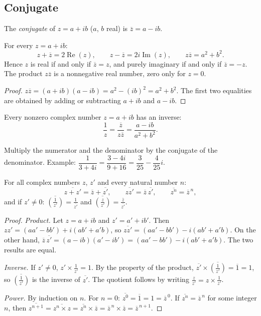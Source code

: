 \subsection{Conjugate}
\begin{definition}[Conjugate]
The \emph{conjugate} of $z=a+ib$ ($a$, $b$ real) is $\overline{z}=a-ib$.
\end{definition}
\begin{theorem}
For every $z=a+ib$:
\[z+\overline z=2\operatorname{Re}(z),\qquad z-\overline z=2i\operatorname{Im}(z),\qquad z\overline z=a^2+b^2.\]
Hence $z$ is real if and only if $\overline z=z$, and purely imaginary if and only if $\overline z=-z$. The product $z\overline z$ is a nonnegative real number, zero only for $z=0$.
\end{theorem}
\begin{proof}
$z\overline z=(a+ib)(a-ib)=a^2-(ib)^2=a^2+b^2$. The first two equalities are obtained by adding or subtracting $a+ib$ and $a-ib$.
\end{proof}
\begin{theorem}
Every nonzero complex number $z=a+ib$ has an inverse:
\[\frac1z=\frac{\overline z}{z\overline z}=\frac{a-ib}{a^2+b^2}.\]
\end{theorem}
\begin{method}
Multiply the numerator and the denominator by the conjugate of the denominator. Example: $\dfrac{1}{3+4i}=\dfrac{3-4i}{9+16}=\dfrac{3}{25}-\dfrac{4}{25}i$.
\end{method}
\begin{theorem}
For all complex numbers $z$, $z'$ and every natural number $n$:
\[\overline{z+z'}=\overline z+\overline{z'},\qquad\overline{zz'}=\overline z\,\overline{z'},\qquad\overline{z^n}=\overline z^{\,n},\]
and if $z'\neq0$: $\overline{\left(\frac1{z'}\right)}=\frac1{\overline{z'}}$ and $\overline{\left(\frac z{z'}\right)}=\frac{\overline z}{\overline{z'}}$.
\end{theorem}
\begin{proof}
\emph{Product.} Let $z=a+ib$ and $z'=a'+ib'$. Then $zz'=(aa'-bb')+i(ab'+a'b)$, so $\overline{zz'}=(aa'-bb')-i(ab'+a'b)$. On the other hand, $\overline z\,\overline{z'}=(a-ib)(a'-ib')=(aa'-bb')-i(ab'+a'b)$. The two results are equal.\par
\emph{Inverse.} If $z'\neq0$, $z'\times\frac1{z'}=1$. By the property of the product, $\overline{z'}\times\overline{\left(\frac1{z'}\right)}=\overline1=1$, so $\overline{\left(\frac1{z'}\right)}$ is the inverse of $\overline{z'}$. The quotient follows by writing $\frac z{z'}=z\times\frac1{z'}$.\par
\emph{Power.} By induction on $n$. For $n=0$: $\overline{z^0}=\overline1=1=\overline z^{\,0}$. If $\overline{z^n}=\overline z^{\,n}$ for some integer $n$, then $\overline{z^{n+1}}=\overline{z^n\times z}=\overline{z^n}\times\overline z=\overline z^{\,n}\times\overline z=\overline z^{\,n+1}$.
\end{proof}

